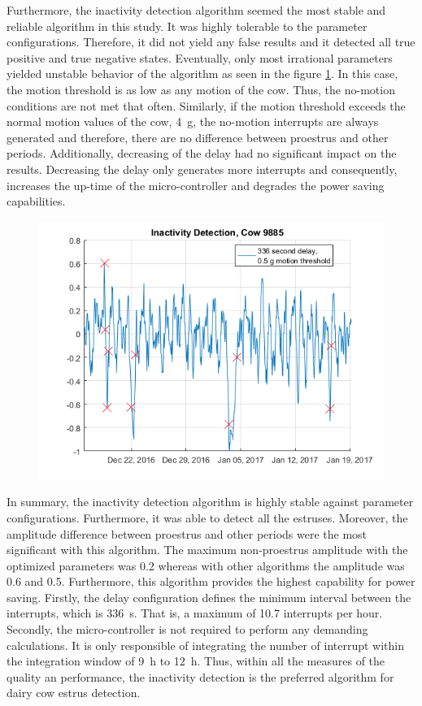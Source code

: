 \documentclass[english,12pt,a4paper,pdftex,elec,utf8]{aaltothesis}
\begin{document}
Furthermore, the inactivity detection algorithm seemed the most stable and reliable algorithm in this study. It was highly tolerable to the parameter configurations. Therefore, it did not yield any false results and it detected all true positive and true negative states. Eventually, only most irrational parameters yielded unstable behavior of the algorithm as seen in the figure \ref{InactivityDetectionCow9885_336period05threshold}. In this case, the motion threshold is as low as any motion of the cow. Thus, the no-motion conditions are not met that often. Similarly, if the motion threshold exceeds the normal motion values of the cow, \SI{4}{\gram}, the no-motion interrupts are always generated and therefore, there are no difference between proestrus and other periods. Additionally, decreasing of the delay had no significant impact on the results. Decreasing the delay only generates more interrupts and consequently, increases the up-time of the micro-controller and degrades the power saving capabilities. 

\begin{figure}[htb]
\centering
\includegraphics[width = 0.75 \textwidth]{figures/InactivityDetectionCow9885_336period05threshold.png}
\caption{}
\label{InactivityDetectionCow9885_336period05threshold}
\end{figure}

In summary, the inactivity detection algorithm is highly stable against parameter configurations. Furthermore, it was able to detect all the estruses. Moreover, the amplitude difference between proestrus and other periods were the most significant with this algorithm. The maximum non-proestrus amplitude with the optimized parameters was 0.2 whereas with other algorithms the amplitude was 0.6 and 0.5. Furthermore, this algorithm provides the highest capability for power saving. Firstly, the delay configuration defines the minimum interval between the interrupts, which is \SI{336}{\second}. That is, a maximum of 10.7 interrupts per hour. Secondly, the micro-controller is not required to perform any demanding calculations. It is only responsible of integrating the number of interrupt within the integration window of \SI{9}{\hour} to \SI{12}{\hour}. Thus, within all the measures of the quality an performance, the inactivity detection is the preferred algorithm for dairy cow estrus detection.
\end{document}
